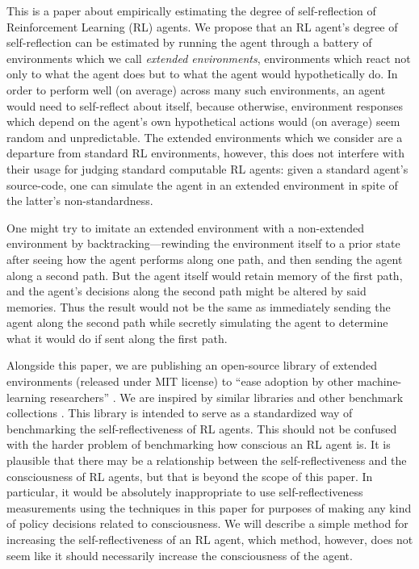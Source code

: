 \documentclass{article}
\begin{document}
This is a paper about empirically estimating the degree of self-reflection of
Reinforcement Learning (RL) agents. We propose that an RL agent's degree of self-reflection
can be estimated by running the agent through a battery of environments which we call
\emph{extended environments}, environments which react not only to what the agent does
but to what the agent would hypothetically do. In order to perform well (on average)
across many such environments, an agent would need to self-reflect about itself, because
otherwise, environment responses which depend on the agent's own hypothetical actions
would (on average) seem random and unpredictable. The extended environments which we
consider are a departure from standard RL environments, however, this does not interfere
with their usage for judging standard computable RL agents: given a standard agent's
source-code, one can simulate the agent in an extended environment in spite of the
latter's non-standardness.

One might try to imitate an extended environment with a non-extended environment by
backtracking---rewinding the environment itself to a prior state after seeing how the
agent performs along one path, and then sending the agent along a second path.
But the agent itself would retain memory of the first path, and the agent's decisions
along the second path might be altered by said memories. Thus the result would not be
the same as immediately sending the agent along the second path while secretly simulating
the agent to determine what it would do if sent along the first path.

Alongside this paper, we are publishing an open-source library of extended
environments (released under MIT license)
to ``ease adoption by other machine-learning researchers''
\cite{sonnenburg2007need}.
We are
inspired by similar libraries and other benchmark collections
\cite{bellemare2013arcade}
\cite{beyret2019animal} \cite{brockman2016openai} \cite{chollet2019measure}
\cite{cobbe2020leveraging}
\cite{hendrycks2019benchmarking}
\cite{yampolskiy2017detecting}.
This library is intended to serve as a standardized way of
benchmarking the self-reflectiveness of RL agents. This should not be confused
with the harder problem of benchmarking how conscious an RL agent is. It is
plausible that there may be a relationship between the self-reflectiveness and
the consciousness of RL agents, but that is beyond the scope of this paper.
In particular, it would be absolutely inappropriate to use self-reflectiveness
measurements using the techniques in this paper for purposes of making any kind
of policy decisions related to consciousness.
We will describe
a simple method for increasing the self-reflectiveness of an RL agent, which method,
however, does not seem like it should necessarily increase the consciousness of
the agent.
\end{document}
